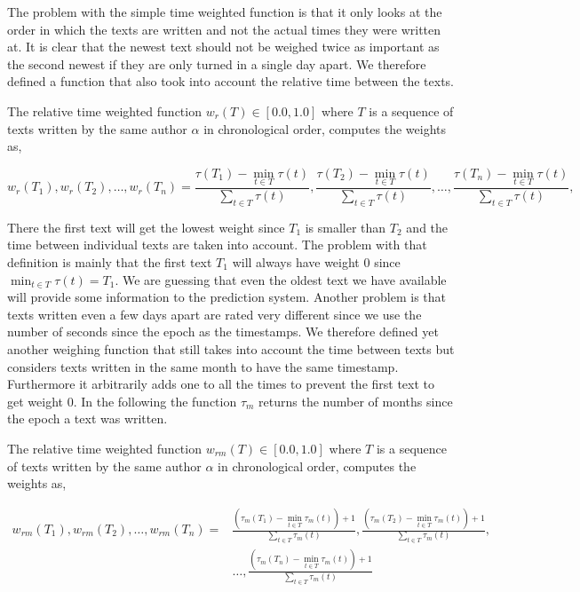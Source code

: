 The problem with the simple time weighted function is that it only looks at the
order in which the texts are written and not the actual times they were written
at. It is clear that the newest text should not be weighed twice as important as
the second newest if they are only turned in a single day apart. We therefore
defined a function that also took into account the relative time between the
texts.

\begin{definition}

    The relative time weighted function $w_r(T) \in [0.0, 1.0]$ where $T$ is a
    sequence of texts written by the same author $\alpha$ in chronological
    order, computes the weights as,

    \begin{equation}
        w_r(T_1), w_r(T_2), \dots, w_r(T_n) =
            \frac{\tau(T_1) - \min_{t \in T} \tau(t)}{\sum_{t \in T} \tau(t)},
            \frac{\tau(T_2) - \min_{t \in T} \tau(t)}{\sum_{t \in T} \tau(t)},
            \dots,
            \frac{\tau(T_n) - \min_{t \in T} \tau(t)}{\sum_{t \in T} \tau(t)},
    \end{equation}

\end{definition}

There the first text will get the lowest weight since $T_1$ is smaller than
$T_2$ and the time between individual texts are taken into account. The problem
with that definition is mainly that the first text $T_1$ will always have weight
0 since $\min_{t \in T} \tau(t) = T_1$. We are guessing that even the oldest
text we have available will provide some information to the prediction system.
Another problem is that texts written even a few days apart are rated very
different since we use the number of seconds since the epoch as the timestamps.
We therefore defined yet another weighing function that still takes into account
the time between texts but considers texts written in the same month to have the
same timestamp. Furthermore it arbitrarily adds one to all the times to prevent
the first text to get weight 0. In the following the function $\tau_m$ returns
the number of months since the epoch a text was written.

\begin{definition}

    The relative time weighted function $w_{rm}(T) \in [0.0, 1.0]$ where $T$ is
    a sequence of texts written by the same author $\alpha$ in chronological
    order, computes the weights as,

    \begin{align}
        w_{rm}(T_1), w_{rm}(T_2), \dots, w_{rm}(T_n) =&
            \frac{(\tau_m(T_1) - \min_{t \in T} \tau_m(t)) + 1}{\sum_{t \in T} \tau_m(t)},
            \frac{(\tau_m(T_2) - \min_{t \in T} \tau_m(t)) + 1}{\sum_{t \in T} \tau_m(t)}, \\
            & \dots,
            \frac{(\tau_m(T_n) - \min_{t \in T} \tau_m(t)) + 1}{\sum_{t \in T} \tau_m(t)}
    \end{align}

\end{definition}

